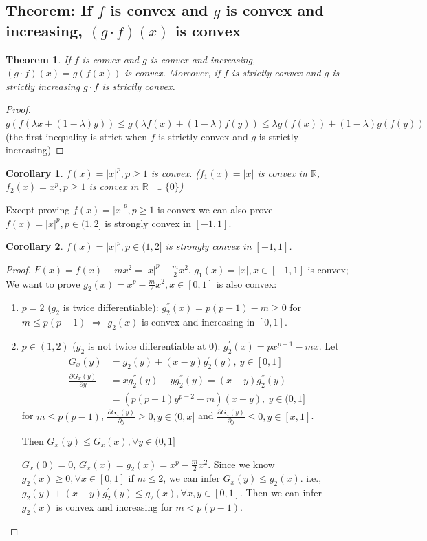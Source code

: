 \documentclass[11pt,a4paper]{article}
\newtheorem{theorem}{Theorem}
\newtheorem{corollary}{Corollary}
\begin{document}
\subsection{Theorem: If $f$ is convex and $g$ is convex and increasing, $(g\cdot f)(x)$ is convex}
\begin{theorem}
    If $f$ is convex and $g$ is convex and increasing, $(g\cdot f)(x)=g(f(x))$ is convex. Moreover, if $f$ is strictly convex and $g$ is strictly increasing $g\cdot f$ is strictly convex.
\end{theorem}
\begin{proof}
$g(f(\lambda x+(1-\lambda)y))\leq g(\lambda f(x)+(1-\lambda) f(y))\leq \lambda g(f(x))+(1-\lambda)g(f(y))$ (the first inequality is strict when $f$ is strictly convex and $g$ is strictly increasing)
\end{proof}
\begin{corollary}
    $f(x)=|x|^p,p\geq 1$ is convex. ($f_1(x)=|x|$ is convex in $\mathbb{R}$, $f_2(x)=x^p,p\geq 1$ is convex in $\mathbb{R}^+\cup\{0\}$)
\end{corollary}
Except proving $f(x)=|x|^p,p\geq 1$ is convex we can also prove $f(x)=|x|^p,p\in(1,2]$ is strongly convex in $[-1,1]$.
\begin{corollary}
    $f(x)=|x|^p,p\in(1,2]$ is strongly convex in $[-1,1]$.
\end{corollary}
\begin{proof}
$F(x)=f(x)-mx^2=|x|^p-\frac{m}{2}x^2$. $g_1(x)=|x|,x\in [-1,1]$ is convex; We want to prove $g_2(x)=x^p-\frac{m}{2}x^2,x\in [0,1]$ is also convex:
\begin{enumerate}[(1)]
    \item $p= 2$ ($g_2$ is twice differentiable): $g_2^{''}(x)=p(p-1)-m\geq 0$ for $m\leq p(p-1)$ $\Rightarrow$ $g_2(x)$ is convex and increasing in $[0,1]$.
    \item $p\in (1,2)$ ($g_2$ is not twice differentiable at $0$): $g_2^{'}(x)=px^{p-1}-mx$. Let
    \begin{equation}
        \begin{aligned}
            G_x(y)&=g_2(y)+(x-y)g_2^{'}(y),\ y\in [0,1]\\
            \frac{\partial G_x(y)}{\partial y}&=xg^{''}_2(y)-yg^{''}_2(y)=(x-y)g^{''}_2(y)\\
            &=\left(p(p-1)y^{p-2}-m\right)(x-y),\ y\in(0,1]
        \end{aligned}
        \nonumber
    \end{equation}
    for $m\leq p(p-1)$, $\frac{\partial G_x(y)}{\partial y}\geq 0, y\in (0,x]$ and $\frac{\partial G_x(y)}{\partial y}\leq 0, y\in [x,1]$.

    Then $G_x(y)\leq G_x(x),\forall y\in (0,1]$

    $G_x(0)=0$, $G_x(x)=g_2(x)=x^p-\frac{m}{2}x^2$. Since we know $g_2(x)\geq 0,\forall x\in [0,1]$ if $m\leq 2$, we can infer $G_x(y)\leq g_2(x)$. i.e., $g_2(y)+(x-y)g_2^{'}(y)\leq g_2(x),\forall x,y\in [0,1]$. Then we can infer $g_2(x)$ is convex and increasing for $m<p(p-1)$.
\end{enumerate}
\end{proof}
\end{document}
